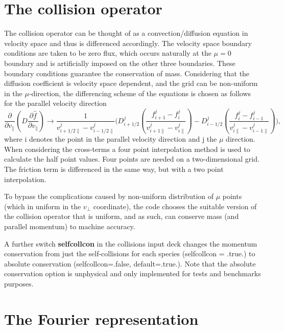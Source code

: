 \section{The collision operator}
\label{numerics:collisions}
The collision operator can be thought of as a convection/diffusion equation in velocity space and thus is differenced accordingly.
The velocity space boundary conditions are taken to be zero flux, which occurs naturally at the $\mu =0$ boundary and is artificially
imposed on the other three boundaries.  These boundary conditions guarantee the conservation of mass.  
Considering that the diffusion coefficient is velocity space dependent, and the grid can be non-uniform in the $\mu$-direction, the differencing scheme of the equations is chosen as follows for the parallel velocity direction
\begin{equation}
\frac{\partial}{\partial v_\parallel}\left(D\frac{\partial \hat{f}}{\partial v_{\parallel}}\right) \rightarrow
\frac{1}{v_{i+1/2\parallel}^{j}-v_{i-1/2\parallel}^{j}}\Big( D_{i+1/2}^{j}\left(\frac{f_{i+1}^{j}-f_{i}^{j}}{v_{i+1\parallel}^{j}-v_{i\parallel}^{j}}\right) - 
D_{i-1/2}^{j}\left(\frac{f_{i}^{j}-f_{i-1}^{j}}{v_{i\parallel}^{j}-v_{i-1\parallel}^{j}}\right)\Big),
\end{equation}
\noindent
where i denotes the point in the parallel velocity direction and j the $\mu$ direction.  When considering the cross-terms a four point 
interpolation method is used to calculate the half point values.  Four points are needed on a two-dimensional grid.
The friction term is differenced in the same way, but with a two point interpolation.  

To bypass the complications caused by non-uniform distribution of $\mu$ points (which in uniform in the $v_\perp$ coordinate), the code chooses the suitable version of the
collision operator that is uniform, and as such, can conserve mass (and parallel momentum) to machine accuracy.  

A further switch \textbf{selfcollcon} in the collisions input deck changes the momentum conservation from just the self-collisions for each species (selfcollcon = .true.) to absolute conservation (selfcollcon=.false, default=.true.). Note that the absolute conservation option is unphysical and only implemented for tests and benchmarks purposes.

\section{The Fourier representation} 

